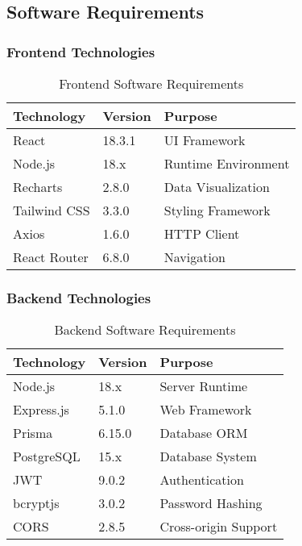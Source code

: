 \documentclass[12pt]{article}
\begin{document}
\subsection{Software Requirements}

\subsubsection{Frontend Technologies}
\begin{table}[H]
\centering
\begin{tabular}{|l|l|l|}
\hline
\textbf{Technology} & \textbf{Version} & \textbf{Purpose} \\
\hline
React & 18.3.1 & UI Framework \\
Node.js & 18.x & Runtime Environment \\
Recharts & 2.8.0 & Data Visualization \\
Tailwind CSS & 3.3.0 & Styling Framework \\
Axios & 1.6.0 & HTTP Client \\
React Router & 6.8.0 & Navigation \\
\hline
\end{tabular}
\caption{Frontend Software Requirements}
\label{tab:frontend_software}
\end{table}

\subsubsection{Backend Technologies}
\begin{table}[H]
\centering
\begin{tabular}{|l|l|l|}
\hline
\textbf{Technology} & \textbf{Version} & \textbf{Purpose} \\
\hline
Node.js & 18.x & Server Runtime \\
Express.js & 5.1.0 & Web Framework \\
Prisma & 6.15.0 & Database ORM \\
PostgreSQL & 15.x & Database System \\
JWT & 9.0.2 & Authentication \\
bcryptjs & 3.0.2 & Password Hashing \\
CORS & 2.8.5 & Cross-origin Support \\
\hline
\end{tabular}
\caption{Backend Software Requirements}
\label{tab:backend_software}
\end{table}
\end{document}
